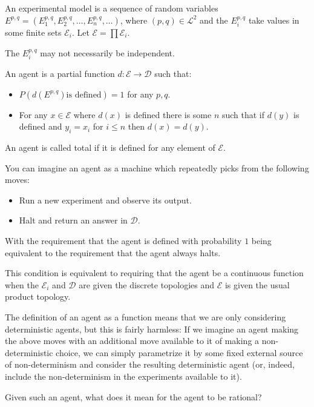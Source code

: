 \begin{definition}
An experimental model is a sequence of random variables 
$E^{p, q} = (E^{p, q}_1, E^{p, q}_2, \ldots, E^{p, q}_n, \ldots)$, where
$(p, q) \in \mathcal{L}^2$ and the $E^{p, q}_i$ take values in some finite
sets $\mathcal{E}_i$. Let $\mathcal{E} = \prod \mathcal{E}_i$.

The $E^{p, q}_i$ may not necessarily be independent.

An agent is a partial function
$d: \mathcal{E} \to \mathcal{D}$ such that:

\begin{itemize}
\item $P(d(E^{p, q}) \text{is defined}) = 1$ for any $p, q$.
\item For any $x \in \mathcal{E}$ where $d(x)$ is defined
there is some $n$ such that if $d(y)$ is defined and $y_i = x_i$
for $i \leq n$ then $d(x) = d(y)$.
\end{itemize}

An agent is called total if it is defined for any element of $\mathcal{E}$.
\end{definition}

You can imagine an agent as a machine which repeatedly picks from the
following moves:

\begin{itemize}
\item Run a new experiment and observe its output.
\item Halt and return an answer in $\mathcal{D}$.
\end{itemize}

With the requirement that the agent is defined with probability $1$ being
equivalent to the requirement that the agent always halts.

This condition is equivalent to requiring that the agent be a continuous
function when the $\mathcal{E}_i$
and $\mathcal{D}$
are given the discrete topologies and $\mathcal{E}$
is given the usual product topology.

The definition of an agent as a function means that we are only considering
deterministic agents, but this is fairly harmless: If we imagine an agent
making the above moves with an additional move available to it of making
a non-deterministic choice, we can simply parametrize it by some fixed
external source of non-determinism and consider the resulting deterministic
agent (or, indeed, include the non-determinism in the experiments available
to it).

Given such an agent, what does it mean for the agent to be rational?

